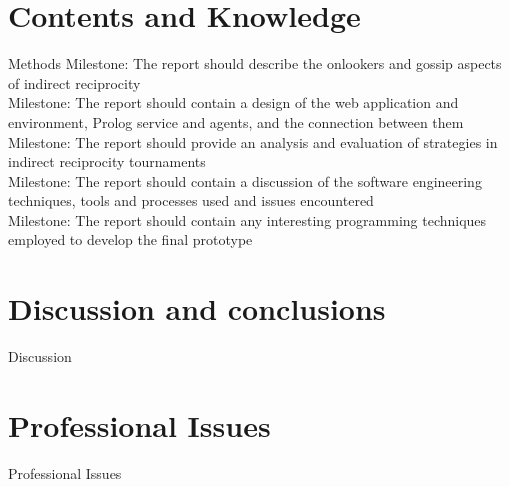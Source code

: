 \chapter{Contents and Knowledge}
Methods
Milestone: The report should describe the onlookers and gossip aspects of indirect reciprocity\\
Milestone: The report should contain a design of the web application and environment, Prolog service and agents, and the connection between them\\
Milestone: The report should provide an analysis and evaluation of strategies in indirect reciprocity tournaments\\
Milestone: The report should contain a discussion of the software engineering techniques, tools and processes used and issues encountered\\
Milestone: The report should contain any interesting programming techniques employed to develop the final prototype\\


\chapter{Discussion and conclusions}
Discussion

{}


\chapter*{Professional Issues}
Professional Issues


